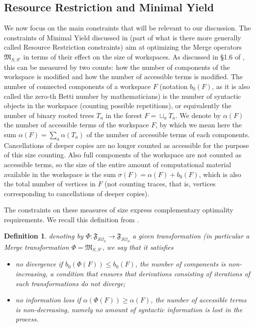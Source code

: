 \documentclass[12pt]{amsart}
\newtheorem{defn}[prop]{Definition}
\numberwithin{equation}{section}
\def\cO{{\mathcal O}}
\def\cS{{\mathcal S}}
\def\fM{{\mathfrak M}}
\def\fF{{\mathfrak F}}
\begin{document}
 

\medskip
\subsection{Resource Restriction and Minimal Yield}\label{MYsec}

We now focus on the main constraints that will be relevant to our discussion.
The constraints of Minimal Yield discussed in \cite{ChomskyElements} 
(part of what is there more generally called Resource Restriction constraints)
aim at optimizing the Merge operators $\fM_{S,S'}$ in terms of their effect on
the size of workspaces. As discussed in \S 1.6 of \cite{MCB}, this can be 
measured by two counts: how the number of components of the workspace
is modified and how the number of accessible terms is modified.
The number of connected components of a workspace $F$ (notation $b_0(F)$, as it is also called
the zero-th Betti number by mathematicians) is the number of syntactic
objects  in the workspace (counting possible repetitions), or equivalently the
number of binary rooted trees $T_a$ in the forest $F=\sqcup_a T_a$. We denote by $\alpha(F)$
the number of accessible terms of the workspace $F$, by which we mean here
the sum $\alpha(F)=\sum_a \alpha(T_a)$ of the number of accessible terms of each components. 
Cancellations of deeper copies are no longer counted as accessible for the purpose of this
size counting. Also full components of the workspace are not counted as
accessible terms, so the size of the entire amount of computational material
available in the workspace is the sum $\sigma(F)=\alpha(F)+b_0(F)$, which is
also the total number of vertices in $F$ (not counting traces, that is, 
vertices corresponding to cancellations of deeper copies). 

The constraints on these measures of size express complementary optimality
requirements. We recall this definition from \cite{MCB}.

\begin{defn}\label{MYdef}
denoting by $\Phi: \fF_{\cS\cO_0} \to \fF_{\cS\cO_0}$ a given
transformation (in particular a Merge transformation $\Phi=\fM_{S,S'}$, we say that
it satisfies 
\begin{itemize}
\item {\em no divergence} if $b_0(\Phi(F)) \leq b_0(F)$, the number of
components is non-increasing, a condition that ensures that derivations
consisting of iterations of such transformations do not diverge;
\item {\em no information loss} if $\alpha(\Phi(F)) \geq \alpha(F)$, the
number of accessible terms is non-decreasing, namely no amount
of syntactic information is lost in the process.
\end{itemize}
\end{defn}
\end{document}
